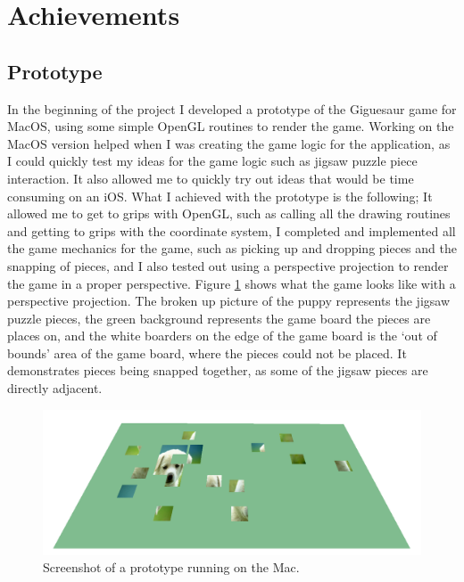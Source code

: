 \documentclass{article}
\begin{document}

\section{Achievements}

\subsection{Prototype}
In the beginning of the project I developed a prototype of the Giguesaur game
for MacOS, using some simple \gls{OpenGL} routines to render the game. Working on the
MacOS version helped when I was creating the game logic for the application, as
I could quickly test my ideas for the game logic such as jigsaw puzzle piece
interaction. It also allowed me to quickly try out ideas that would be time
consuming on an iOS. What I achieved with the prototype is the following; It
allowed me to get to grips with OpenGL, such as calling all the drawing routines
and getting to grips with the coordinate system, I completed and implemented all
the game mechanics for the game, such as picking up and dropping pieces and the
snapping of pieces, and I also tested out using a perspective projection to
render the game in a proper perspective. Figure \ref{fig:MacBuild} shows what
the game looks like with a perspective projection. The broken up picture of the
puppy \cite{img:OpenGLPuppy} represents the jigsaw puzzle pieces, the green
background represents the game board the pieces are places on, and the white
boarders on the edge of the game board is the `out of bounds' area of the game
board, where the pieces could not be placed. It demonstrates pieces being
snapped together, as some of the jigsaw pieces are directly adjacent.

\begin{figure}[ht]
\begin{center}
\includegraphics[width=1.2\textwidth,center]{images/MacBuildImage}
\caption{Screenshot of a prototype running on the Mac.}
\label{fig:MacBuild}
\end{center}
\end{figure}
\end{document}
